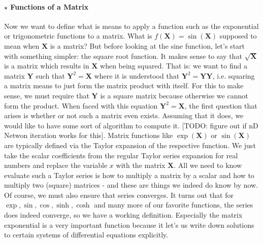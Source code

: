 \paragraph{$\star$ Functions of a Matrix}
Now we want to define what is means to apply a function such as the exponential or trigonometric functions to a matrix. What is $f(\mathbf{X}) = \sin(\mathbf{X})$ supposed to mean when $\mathbf{X}$ is a matrix? But before looking at the sine function, let's start with something simpler: the square root function. It makes sense to say that $\sqrt{\mathbf{X}}$ is a matrix which results in $\mathbf{X}$ when being squared. That is: we want to find a matrix $\mathbf{Y}$ such that $\mathbf{Y}^2 = \mathbf{X}$ where it is understood that $\mathbf{Y}^2 = \mathbf{Y Y}$, i.e. squaring a matrix means to just form the matrix product with itself. For this to make sense, we must require that $\mathbf{Y}$ is a square matrix because otherwise we cannot form the product. When faced with this equation $\mathbf{Y}^2 = \mathbf{X}$, the first question that arises is whether or not such a matrix even exists. Assuming that it does, we would like to have some sort of algorithm to compute it. [TODO: figure out if nD Netwon iteration works for this]. Matrix functions like $\exp(\mathbf{X})$ or $\sin(\mathbf{X})$ are typically defined via the Taylor expansion of the respective function. We just take the scalar coefficients from the regular Taylor series expansion for real numbers and replace the variable $x$ with the matrix  $\mathbf{X}$. All we need to know evaluate such a Taylor series is how to multiply a matrix by a scalar and how to multiply two (square) matrices - and these are things we indeed do know by now. Of course, we must also ensure that series converges. It turns out that for $\exp, \sin, \cos, \sinh, \cosh$ and many more of our favorite functions, the series does indeed converge, so we have a working definition. Especially the matrix exponential is a very important function because it let's us write down solutions to certain systems of differential equations explicitly.





